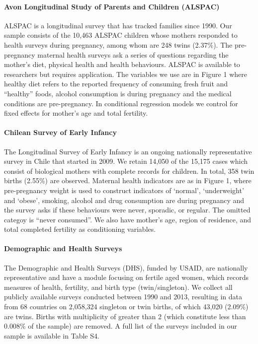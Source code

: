 \documentclass[12pt]{article}
\begin{document}
\paragraph{Avon Longitudinal Study of Parents and Children (ALSPAC)}
ALSPAC is a longitudinal survey that has tracked families since 1990. Our sample consists of the 10,463 ALSPAC children whose mothers responded to health surveys during pregnancy, among whom are 248 twins (2.37\%). The pre-pregnancy maternal health surveys ask a series of questions regarding the mother's diet, physical health and health behaviours. ALSPAC is available to researchers but requires application. The variables we use are in Figure 1 where healthy diet refers to the reported frequency of consuming fresh fruit and ``healthy'' foods, alcohol consumption is during pregnancy and the medical conditions are pre-pregnancy. In conditional regression models we control for fixed effects for mother's age and total fertility.

\paragraph{Chilean Survey of Early Infancy}
The Longitudinal Survey of Early Infancy is an ongoing nationally representative survey in Chile that started in 2009.  We retain 14,050 of the 15,175 cases which consist of biological mothers with complete records for children. In total, 358 twin births (2.55\%) are observed. Maternal health indicators are as in Figure 1, where pre-pregnancy weight is used to construct indicators of  `normal', `underweight' and `obese', smoking, alcohol and drug consumption are during pregnancy and the survey asks if these behaviours were never, sporadic, or regular. The omitted categoy is ``never consumed''. We also have mother's age, region of residence, and total completed fertility as conditioning variables. 

\paragraph{Demographic and Health Surveys}
The Demographic and Health Surveys (DHS), funded by USAID, are nationally representative and have a module focusing on fertile aged women, which records measures of health, fertility, and birth type (twin/singleton).  We collect all publicly available surveys conducted between 1990 and 2013, resulting in data from 68 countries on 2,058,324 singleton or twin births, of which 43,020 (2.09\%) are twins.  Births with multiplicity of greater than 2 (which constitute less than 0.008\% of the sample) are removed.  A full list of the surveys included in our sample is available in Table S4.
\end{document}
